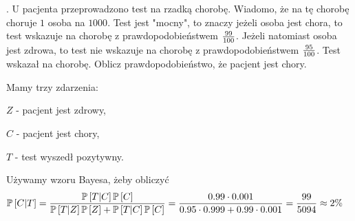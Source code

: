 . U pacjenta przeprowadzono test na rzadką chorobę. Wiadomo, że na tę chorobę choruje $1$ osoba na $1000$. Test jest "mocny", to znaczy jeżeli osoba jest chora, to test wskazuje na chorobę z prawdopodobieństwem ${99\over 100}$. Jeżeli natomiast osoba jest zdrowa, to test nie wskazuje na chorobę z prawdopodobieństwem ${95\over100}$. Test wskazał na chorobę. Oblicz prawdopodobieństwo, że pacjent jest chory.

Mamy trzy zdarzenia:

$Z$ - pacjent jest zdrowy,

$C$ - pacjent jest chory,

$T$ - test wyszedł pozytywny.

Używamy wzoru Bayesa, żeby obliczyć
\begin{align*}
    \mathbb{P}\left[C|T\right]&={\mathbb{P}\left[T|C\right]\mathbb{P}\left[C\right]\over\mathbb{P}\left[T|Z\right]\mathbb{P}\left[Z\right]+\mathbb{P}\left[T|C\right]\mathbb{P}\left[C\right]}={0.99\cdot0.001\over0.95\cdot0.999+0.99\cdot0.001}={99\over 5094}\approx 2\%
\end{align*}
